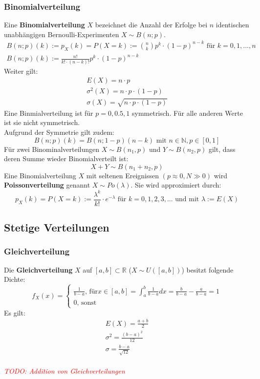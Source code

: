 \documentclass[12pt]{article}
\newcommand\todo[1]{\textit{\textcolor{red}{\\TODO: #1}}}
\begin{document}
\subsubsection{Binomialverteilung}
Eine \textbf{Binomialverteilung} $X$ bezeichnet die Anzahl der Erfolge bei $n$ identischen unabhängigen Bernoulli-Experimenten $X \sim B(n;p)$.  
\begin{gather*}
	B(n;p)(k) := p_X(k) = P(X=k):= {n \choose k}p^k\cdot (1-p)^{n-k} \text{ für } k=0,1,...,n \\
	 B(n;p)(k) := \frac{n!}{k!\cdot(n-k)!}p^k\cdot (1-p)^{n-k}
\end{gather*}
Weiter gilt:
\begin{gather*}
	E(X)=n\cdot p\\
	\sigma^2(X)=n\cdot p \cdot (1-p)\\
	\sigma(X)=\sqrt{n\cdot p\cdot (1-p)}
\end{gather*}
Eine Binmialverteilung ist für $p=0,0.5,1$ symmetrisch. Für alle anderen Werte ist sie nicht symmetrisch.\\
Aufgrund der Symmetrie gilt zudem:
\begin{equation*}
	B(n;p)(k) = B(n;1-p)(n-k) \text{ mit } n\in \mathbb{N}, p\in [0,1]
\end{equation*}
Für zwei Binominalverteilungen $X\sim B(n_1,p)$ und $Y\sim B(n_2,p)$ gilt, dass deren Summe wieder Binomialverteilt ist:
\begin{equation*}
	X+Y\sim B(n_1+n_2,p)
\end{equation*}
Eine Binomialverteilung $X$ mit seltenen Ereignissen $(p\approx0, N\gg 0)$ wird \textbf{Poissonverteilung} genannt $X\sim Po(\lambda)$. Sie wird approximiert durch:
\begin{equation*}
	p_X(k)=P(X=k):=\frac{\lambda^k}{k!}\cdot e^{-\lambda} \text{ für } k=0,1,2,3,... \text{ und mit } \lambda:=E(X)
\end{equation*}
\subsection{Stetige Verteilungen}
\subsubsection{Gleichverteilung}
Die \textbf{Gleichverteilung} $X$ auf $[a,b]\subset \mathbb{R}$ ($X\sim U([a,b])$) besitzt folgende Dichte:
\begin{equation*}
	f_X(x)=\begin{cases}
		\frac{1}{b-a} \text{, für} x\in [a,b] = \int_a^b\frac{1}{b-a}dx=\frac{b}{b-a}-\frac{a}{b-a}=1\\
		0\text{, sonst}
	\end{cases}
\end{equation*}
Es gilt:
\begin{gather*}
	E(X)=\frac{a+b}{2}\\
	\sigma^2 =\frac{(b-a)^2}{12}\\
	\sigma = \frac{b-a}{\sqrt{12}}
\end{gather*}
\todo{Addition von Gleichverteilungen}
\end{document}
